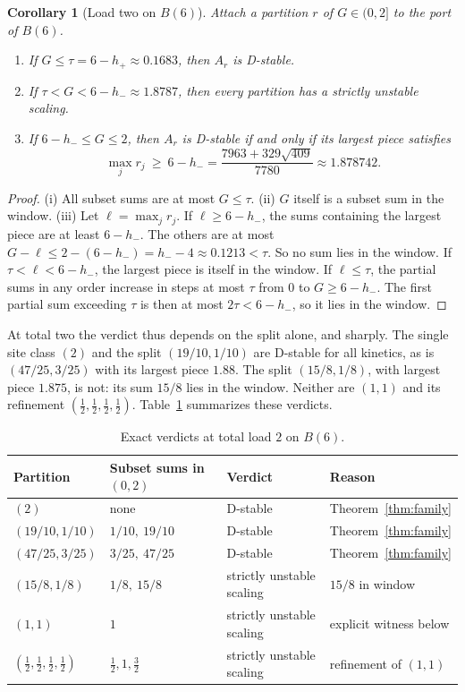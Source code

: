 \documentclass[11pt,a4paper]{article}
\theoremstyle{plain}
\newtheorem{corollary}[theorem]{Corollary}
\theoremstyle{definition}
\theoremstyle{remark}
\begin{document}
\begin{corollary}[Load two on $B(6)$]\label{cor:G2}
Attach a partition $r$ of $G\in(0,2]$ to the port of $B(6)$.
\begin{enumerate}[label=(\roman*)]
\item If $G\le\tau=6-h_+\approx0.1683$, then $A_r$ is D-stable.
\item If $\tau<G<6-h_-\approx1.8787$, then every partition has a strictly
unstable scaling.
\item If $6-h_-\le G\le2$, then $A_r$ is D-stable if and only if its largest
piece satisfies
\[
 \max_jr_j\ \ge\ 6-h_-=\frac{7963+329\sqrt{409}}{7780}\approx1.878742 .
\]
\end{enumerate}
\end{corollary}
\begin{proof}
(i) All subset sums are at most $G\le\tau$. (ii) $G$ itself is a subset sum
in the window. (iii) Let $\ell=\max_jr_j$. If $\ell\ge6-h_-$, the sums
containing the largest piece are at least $6-h_-$. The others are at most
$G-\ell\le2-(6-h_-)=h_--4\approx0.1213<\tau$. So no sum lies in the window. If
$\tau<\ell<6-h_-$, the largest piece is itself in the window. If $\ell\le\tau$,
the partial sums in any order increase in steps at most $\tau$ from $0$ to
$G\ge6-h_-$. The first partial sum exceeding $\tau$ is
then at most $2\tau<6-h_-$, so it lies in the window.
\end{proof}

At total two the verdict thus depends on the split alone, and sharply. The
single site class $(2)$ and the split $(19/10,1/10)$ are D-stable for all
kinetics, as is $(47/25,3/25)$ with its largest piece $1.88$. The split
$(15/8,1/8)$, with largest piece $1.875$, is not: its sum $15/8$ lies in the
window. Neither are $(1,1)$ and its refinement $(\tfrac12,\tfrac12,\tfrac12,
\tfrac12)$. Table~\ref{tab:verdicts} summarizes these verdicts.

\begin{table}[t]
\centering
\caption{Exact verdicts at total load $2$ on $B(6)$.}
\label{tab:verdicts}
\begin{tabular}{@{}llll@{}}\toprule
Partition & Subset sums in $(0,2)$ & Verdict & Reason\\\midrule
$(2)$ & none & D-stable & Theorem~\ref{thm:family}\\
$(19/10,1/10)$ & $1/10,\ 19/10$ & D-stable & Theorem~\ref{thm:family}\\
$(47/25,3/25)$ & $3/25,\ 47/25$ & D-stable & Theorem~\ref{thm:family}\\
$(15/8,1/8)$ & $1/8,\ 15/8$ & strictly unstable scaling & $15/8$ in window\\
$(1,1)$ & $1$ & strictly unstable scaling & explicit witness below\\
$(\tfrac12,\tfrac12,\tfrac12,\tfrac12)$ & $\tfrac12,1,\tfrac32$ & strictly unstable scaling & refinement of $(1,1)$\\
\bottomrule\end{tabular}
\end{table}
\end{document}
